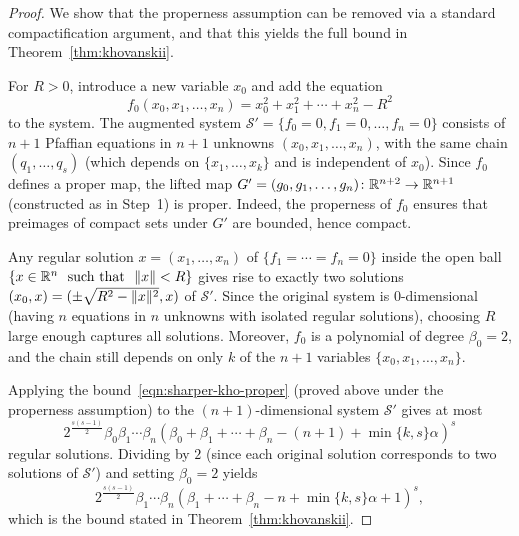 \begin{proof}
We show that the properness assumption can be removed via a standard compactification argument, and that this yields the full bound in Theorem~\ref{thm:khovanskii}.

For $R > 0$, introduce a new variable $x_0$ and add the equation
\begin{equation*}
  f_0(x_0, x_1, \ldots, x_n) = x_0^2 + x_1^2 + \cdots + x_n^2 - R^2
\end{equation*}
to the system. The augmented system $\mathcal{S}' = \{f_0 = 0, f_1 = 0, \ldots, f_n = 0\}$ consists of $n+1$ Pfaffian equations in $n+1$ unknowns $(x_0, x_1, \ldots, x_n)$, with the same chain $(q_1, \ldots, q_s)$ (which depends on $\{x_1, \ldots, x_k\}$ and is independent of $x_0$). Since $f_0$ defines a proper map, the lifted map $G' = (g_0, g_1, \ldots, g_n)\colon \mathbb{R}^{n+2} \to \mathbb{R}^{n+1}$ (constructed as in Step~1) is proper. Indeed, the properness of $f_0$ ensures that preimages of compact sets under $G'$ are bounded, hence compact.

Any regular solution $x = (x_1, \ldots, x_n)$ of $\{f_1 = \cdots = f_n = 0\}$ inside the open ball $\{x \in \mathbb{R}^n \ \text{ such that }\  \Vert {x}\Vert < R\}$ gives rise to exactly two solutions $(x_0, x) = (\pm\sqrt{R^2 - \Vert {x}\Vert^2}, x)$ of $\mathcal{S}'$. Since the original system is $0$-dimensional (having $n$ equations in $n$ unknowns with isolated regular solutions), choosing $R$ large enough captures all solutions. Moreover, $f_0$ is a polynomial of degree $\beta_0 = 2$, and the chain still depends on only $k$ of the $n+1$ variables $\{x_0, x_1, \ldots, x_n\}$.

Applying the bound~\eqref{eqn:sharper-kho-proper} (proved above under the properness assumption) to the $(n+1)$-dimensional system $\mathcal{S}'$ gives at most
\begin{equation*}
  2^{\frac{s(s-1)}{2}} \beta_0 \beta_1 \dotsm \beta_n \left(\beta_0 + \beta_1 + \dotsb + \beta_n - (n+1) + \min\{k,s\}\alpha\right)^s
\end{equation*}
regular solutions. Dividing by $2$ (since each original solution corresponds to two solutions of $\mathcal{S}'$) and setting $\beta_0 = 2$ yields
\begin{equation*}
  2^{\frac{s(s-1)}{2}} \beta_1 \dotsm \beta_n \left(\beta_1 + \dotsb + \beta_n - n + \min\{k,s\}\alpha + 1\right)^s,
\end{equation*}
which is the bound stated in Theorem~\ref{thm:khovanskii}.
\end{proof}
